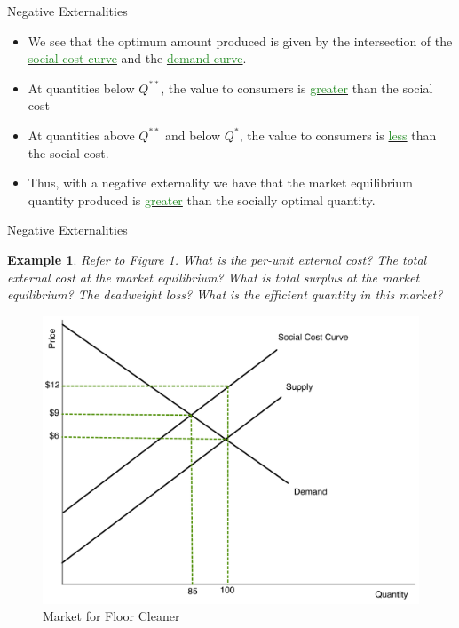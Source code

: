 \documentclass[xcolor={dvipsnames},pdf, hyperref={colorlinks=true, citecolor=ForestGreen, linkcolor=BlueViolet, urlcolor=Magenta}]{beamer}
\newtheorem{exmp}{Example}[section]
\newcommand{\dd}[1]{{\underline{\textcolor{ForestGreen}{#1}}}}
\begin{document}
\begin{frame}{Negative Externalities}
	\begin{itemize}
		\item 	We see that the optimum amount produced is given by the intersection of the \dd{social cost curve} and the \dd{demand curve}. 
		\item At quantities below $Q^{**}$, the value to consumers is \dd{greater} than the social cost
		\item  At quantities above $Q^{**}$ and below $Q^*$, the value to consumers is \dd{less} than the social cost.
		\item Thus, with a negative externality we have that the market equilibrium quantity produced is \dd{greater} than the socially optimal quantity. 
	\end{itemize}
\end{frame}

\begin{frame}{Negative Externalities}
	\begin{exmp} 
		\scriptsize
			Refer to Figure \ref{fig4}. What is the per-unit external cost? The total external cost at the market equilibrium? What is total surplus at the market equilibrium? The deadweight loss? What is the efficient quantity in this market?
		\end{exmp}
	
			\begin{figure}[ht!]
		\centering
		\includegraphics[scale=.30]{notes06_plot1.pdf}
		\caption{Market for Floor Cleaner}
		\label{fig4}
	\end{figure}


\end{frame}
\end{document}

